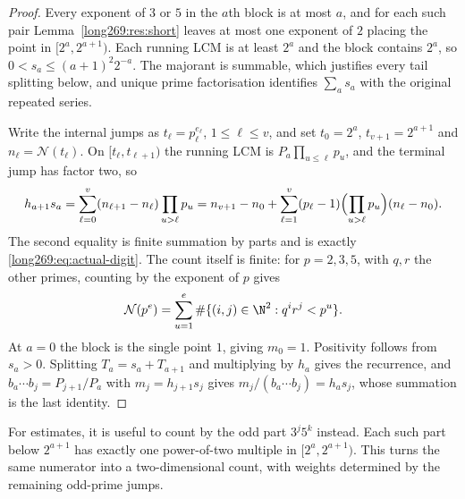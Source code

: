\begin{proof}
Every exponent of $3$ or $5$ in the $a$th block is at most $a$, and for each
such pair Lemma~\ref{long269:res:short} leaves at most one exponent of $2$ placing the
point in $[2^{a},2^{a+1})$.  Each running LCM is at least $2^{a}$ and the block
contains $2^{a}$, so $0<s_a\le(a+1)^{2}2^{-a}$.  The majorant is summable,
which justifies every tail splitting below, and unique prime factorisation
identifies $\sum_a s_a$ with the original repeated series.

Write the internal jumps as $t_\ell=p_\ell^{e_\ell}$, $1\le\ell\le v$, and set
$t_0=2^{a}$, $t_{v+1}=2^{a+1}$ and $n_\ell=\mathcal N(t_\ell)$.
On $[t_\ell,t_{\ell+1})$ the
running LCM is $P_a\prod_{u\le\ell}p_u$, and the terminal jump has factor two, so
\[
 h_{a+1}s_a
 =\sum_{\ell=0}^{v}(n_{\ell+1}-n_\ell)\prod_{u>\ell}p_u
 =n_{v+1}-n_0+\sum_{\ell=1}^{v}(p_\ell-1)
        \Bigl(\prod_{u>\ell}p_u\Bigr)(n_\ell-n_0).
\]
The second equality is finite summation by parts and is exactly
\eqref{long269:eq:actual-digit}.  The count itself is finite: for $p=2,3,5$,
with $q,r$ the other primes, counting by the exponent of $p$ gives
\[
 \mathcal N(p^e)=\sum_{u=1}^e\#\{(i,j)\in\N^2:q^ir^j<p^u\}.
\]
At $a=0$ the block is the single point $1$, giving $m_0=1$.  Positivity follows from $s_a>0$.  Splitting $T_a=s_a+T_{a+1}$ and
multiplying by $h_a$ gives the recurrence, and
$b_a\cdots b_j=P_{j+1}/P_a$ with $m_j=h_{j+1}s_j$ gives
$m_j/(b_a\cdots b_j)=h_as_j$, whose summation is the last identity.
\end{proof}

For estimates, it is useful to count by the odd part $3^j5^k$ instead.
Each such part below $2^{a+1}$ has exactly one power-of-two multiple in
$[2^a,2^{a+1})$.  This turns the same numerator into a two-dimensional
count, with weights determined by the remaining odd-prime jumps.

